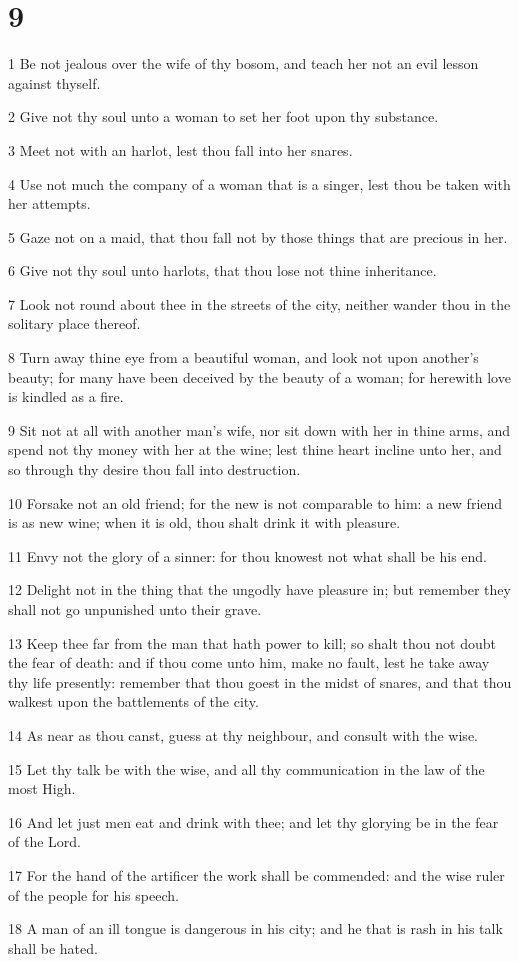 \chapter{9}

\par 1 Be not jealous over the wife of thy bosom, and teach her not an evil lesson against thyself.
\par 2 Give not thy soul unto a woman to set her foot upon thy substance.
\par 3 Meet not with an harlot, lest thou fall into her snares.
\par 4 Use not much the company of a woman that is a singer, lest thou be taken with her attempts.
\par 5 Gaze not on a maid, that thou fall not by those things that are precious in her.
\par 6 Give not thy soul unto harlots, that thou lose not thine inheritance.
\par 7 Look not round about thee in the streets of the city, neither wander thou in the solitary place thereof.
\par 8 Turn away thine eye from a beautiful woman, and look not upon another's beauty; for many have been deceived by the beauty of a woman; for herewith love is kindled as a fire.
\par 9 Sit not at all with another man's wife, nor sit down with her in thine arms, and spend not thy money with her at the wine; lest thine heart incline unto her, and so through thy desire thou fall into destruction.
\par 10 Forsake not an old friend; for the new is not comparable to him: a new friend is as new wine; when it is old, thou shalt drink it with pleasure.
\par 11 Envy not the glory of a sinner: for thou knowest not what shall be his end.
\par 12 Delight not in the thing that the ungodly have pleasure in; but remember they shall not go unpunished unto their grave.
\par 13 Keep thee far from the man that hath power to kill; so shalt thou not doubt the fear of death: and if thou come unto him, make no fault, lest he take away thy life presently: remember that thou goest in the midst of snares, and that thou walkest upon the battlements of the city.
\par 14 As near as thou canst, guess at thy neighbour, and consult with the wise.
\par 15 Let thy talk be with the wise, and all thy communication in the law of the most High.
\par 16 And let just men eat and drink with thee; and let thy glorying be in the fear of the Lord.
\par 17 For the hand of the artificer the work shall be commended: and the wise ruler of the people for his speech.
\par 18 A man of an ill tongue is dangerous in his city; and he that is rash in his talk shall be hated.

